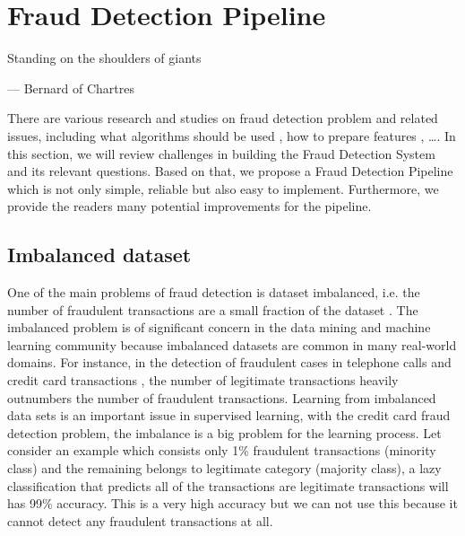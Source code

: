 \chapter{Fraud Detection Pipeline}
\label{fraud_detection_pipeline}

\ifpdf
    \graphicspath{{Chapter3/Figs/Raster/}{Chapter3/Figs/PDF/}{Chapter3/Figs/}}
\else
    \graphicspath{{Chapter3/Figs/Vector/}{Chapter3/Figs/}}
\fi

\vspace*{\fill}
\thispagestyle{empty}
\epigraph{Standing on the shoulders of giants }{ --- Bernard of Chartres}
\thispagestyle{empty}

There are various research and studies on fraud detection problem and related issues,  including what algorithms should be used \citep{leonard1993detecting, bolton2001unsupervised, mahmoudi2015detecting}, how to prepare features \citep{bahnsen2016feature, whitrow2009transaction, fast2007relational}, \dots. In this section, we will review challenges in building the Fraud Detection System and its relevant questions. Based on that, we propose a Fraud Detection Pipeline which is not only simple, reliable but also easy to implement. Furthermore, we provide the readers many potential improvements for the pipeline.


\section{Imbalanced dataset}
\label{imbalanced_dataset}

One of the main problems of fraud detection is dataset imbalanced, i.e. the number of fraudulent transactions are a small fraction of the dataset \citep{juszczak2008off}. The imbalanced problem is of significant concern in the data mining and machine learning community because imbalanced datasets are common in many real-world domains. For instance, in the detection of fraudulent cases in telephone calls \citep{fawcett1997adaptive} and credit card transactions \citep{chan1999distributed}, the number of legitimate transactions heavily outnumbers the number of fraudulent transactions. Learning from imbalanced data sets is an important issue in supervised learning, with the credit card fraud detection problem, the imbalance is a big problem for the learning process. Let consider an example which consists only 1\% fraudulent transactions (minority class) and the remaining belongs to legitimate category (majority class), a lazy classification that predicts all of the transactions are legitimate transactions will has 99\% accuracy. This is a very high accuracy but we can not use this because it cannot detect any fraudulent transactions at all.

